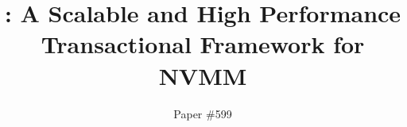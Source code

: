 \title{\sys: A Scalable and High Performance Transactional Framework for NVMM}

\newcommand{\gt}{{\textsuperscript{$\dagger$}}}

\author{%
\texorpdfstring{
Paper \#599
}{}
}


